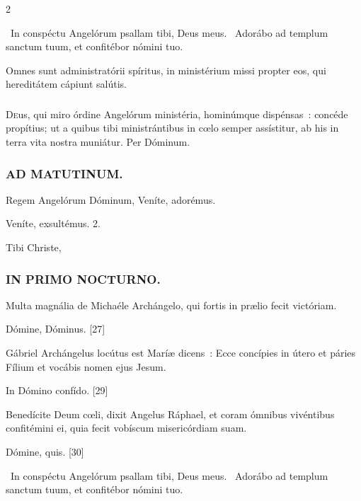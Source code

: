 \documentclass[9pt,twoside]{extarticle}
\begin{document}
\begin{multicols}{2}
{\begin{tightlist}{}
\item {}~In conspéctu Angelórum psallam tibi, Deus meus. ~Adorábo ad templum sanctum tuum, et confitébor nómini tuo.
\item {} Omnes sunt administratórii spíritus, in ministérium missi propter eos, qui hereditátem cápiunt salútis.
\end{tightlist}

\subsubsection*{\center {}}
\lettrine{D}eus, qui miro órdine Angelórum ministéria, hominúmque dispénsas~: concéde propítius; ut a quibus tibi ministrántibus in cœlo semper assístitur, ab his in terra vita nostra muniátur. Per Dóminum.

\subsubsection*{\center \textsc{AD MATUTINUM.}}
\begin{tightlist}{}
\item {} Regem Angelórum Dóminum, \textred{*} Veníte, adorémus.
\item {} Veníte, exsultémus. 2.
\item {} Tibi Christe, 
\end{tightlist}

\subsubsection*{\center \textsc{IN PRIMO NOCTURNO.}}
\begin{tightlist}{}
\item {} Multa magnália de Michaéle Archángelo, qui fortis in prælio fecit victóriam.
\item {} Dómine, Dóminus. [27] 
\item {} Gábriel Archángelus locútus est Maríæ dicens~: Ecce concípies in útero et páries Fílium et vocábis nomen ejus Jesum.
\item {} In Dómino confído. [29]
\item {} Benedícite Deum cœli, dixit Angelus Ráphael, et coram ómnibus vivéntibus confitémini ei, quia fecit vobíscum misericórdiam suam.
\item {} Dómine, quis. [30]
\item {}~In conspéctu Angelórum psallam tibi, Deus meus. ~Adorábo ad templum sanctum tuum, et confitébor nómini tuo.
\item {}
\end{tightlist}

}
\end{multicols}
\end{document}
